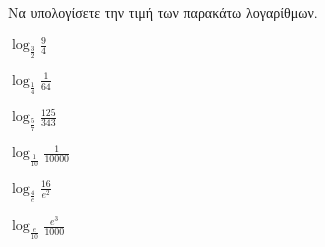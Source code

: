 Να υπολογίσετε την τιμή των παρακάτω λογαρίθμων.
\begin{multicols}{3}
\begin{rlist}[leftmargin=2mm]
\item $ \log_{\frac{3}{2}}{\frac{9}{4}} $
\item $ \log_{\frac{1}{4}}{\frac{1}{64}} $
\item $ \log_{\frac{5}{7}}{\frac{125}{343}} $
\item $ \log_{\frac{1}{10}}{\frac{1}{10000}} $
\item $ \log_{\frac{4}{e}}{\frac{16}{e^2}} $
\item $ \log_{\frac{e}{10}}{\frac{e^3}{1000}} $
\end{rlist}
\end{multicols}
